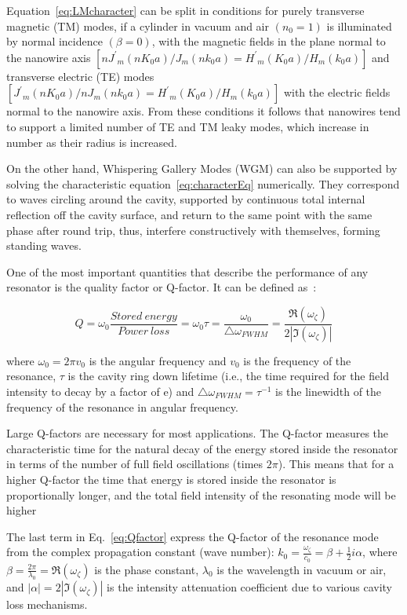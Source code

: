 Equation~\ref{eq:LMcharacter} can be split in conditions for purely transverse
magnetic (TM) modes, if a cylinder in vacuum and air $(n_0=1)$ is illuminated
by normal incidence $(\beta=0)$, with the magnetic fields in the plane normal
to the nanowire axis
$[n{J^\prime}_m(nK_0a)/J_m(nk_0a)={H^\prime}_m(K_0a)/H_m(k_0a)]$ and transverse
electric (TE) modes
$[{J^\prime}_m(nK_0a)/nJ_m(nk_0a)={H^\prime}_m(K_0a)/H_m(k_0a)]$ with the
electric fields normal to the nanowire axis. From these conditions it follows
that nanowires tend to support a limited number of TE and TM leaky modes, which
increase in number as their radius is increased.

On the other hand, Whispering Gallery Modes (WGM) can also be supported by
solving the characteristic equation~\ref{eq:characterEq} numerically. They
correspond to waves circling around the cavity, supported by continuous total
internal reflection off the cavity surface, and return to the same point with
the same phase after round trip, thus, interfere constructively with
themselves, forming standing waves.

One of the most important quantities that describe the performance of any
resonator is the quality factor or Q-factor. It can be defined
as~\cite{tobing2010fundamental}:

\begin{equation}
  Q=\omega_0 \frac{Stored\ energy}{Power\ loss}=\omega_0\tau=\frac{\omega_0}{\triangle\omega_{FWHM}}=\frac{\Re(\omega_\zeta)}{2|\Im(\omega_\zeta)|}
  \label{eq:Qfactor}
\end{equation}

where $\omega_0=2\pi{v_0}$ is the angular frequency and $v_0$ is the frequency
of the resonance, $\tau$ is the cavity ring down lifetime (i.e., the time
required for the field intensity to decay by a factor of e) and
$\triangle\omega_{FWHM}={\tau}^{-1}$ is the linewidth of the frequency of the
resonance in angular frequency.

Large Q-factors are necessary for most applications. The Q-factor measures the
characteristic time for the natural decay of the energy stored inside the
resonator in terms of the number of full field oscillations (times $2\pi$).
This means that for a higher Q-factor the time that energy is stored inside the
resonator is proportionally longer, and the total field intensity of the
resonating mode will be higher 

The last term in Eq.~\ref{eq:Qfactor} express the Q-factor of the resonance
mode from the complex propagation constant (wave number):
$k_0=\frac{\omega_\zeta}{c_0}=\beta+\frac{1}{2}i\alpha$, where
$\beta=\frac{2\pi}{\lambda_0}=\Re(\omega_\zeta)$ is the phase constant,
$\lambda_0$ is the wavelength in vacuum or air, and
$|\alpha|=2|\Im(\omega_\zeta)|$ is the intensity attenuation coefficient due to
various cavity loss mechanisms.

